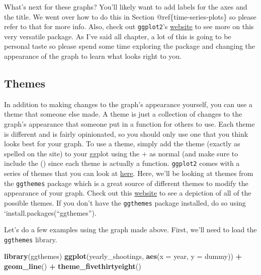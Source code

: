 \documentclass[
  12pt,
]{book}
\newenvironment{Shaded}{\begin{snugshade}}{\end{snugshade}}
\newcommand{\DataTypeTok}[1]{\textcolor[rgb]{0.27,0.27,0.27}{#1}}
\newcommand{\KeywordTok}[1]{\textcolor[rgb]{0.27,0.27,0.27}{\textbf{#1}}}
\newcommand{\NormalTok}[1]{#1}
\newcommand{\OperatorTok}[1]{\textcolor[rgb]{0.43,0.43,0.43}{\textbf{#1}}}
\newcommand{\StringTok}[1]{\textcolor[rgb]{0.5,0.5,0.5}{#1}}
\begin{document}
What's next for these graphs? You'll likely want to add labels for the axes and the title. We went over how to do this in Section @ref\{time-series-plots\} so please refer to that for more info. Also, check out \texttt{ggplot2}'s \href{https://ggplot2.tidyverse.org/reference/index.html\#section-scales}{website} to see more on this very versatile package. As I've said all chapter, a lot of this is going to be personal taste so please spend some time exploring the package and changing the appearance of the graph to learn what looks right to you.

\hypertarget{themes}{%
\subsection{Themes}\label{themes}}

In addition to making changes to the graph's appearance yourself, you can use a theme that someone else made. A theme is just a collection of changes to the graph's appearance that someone put in a function for others to use. Each theme is different and is fairly opinionated, so you should only use one that you think looks best for your graph. To use a theme, simply add the theme (exactly as spelled on the site) to your ggplot using the + as normal (and make sure to include the () since each theme is actually a function. \texttt{ggplot2} comes with a series of themes that you can look at \href{https://ggplot2.tidyverse.org/reference/ggtheme.html}{here}. Here, we'll be looking at themes from the \texttt{ggthemes} package which is a great source of different themes to modify the appearance of your graph. Check out this \href{https://yutannihilation.github.io/allYourFigureAreBelongToUs/ggthemes/}{website} to see a depiction of all of the possible themes. If you don't have the \texttt{ggthemes} package installed, do so using `install.packages(``ggthemes'').

Let's do a few examples using the graph made above. First, we'll need to load the \texttt{ggthemes} library.

\begin{Shaded}
\begin{Highlighting}[]
\KeywordTok{library}\NormalTok{(ggthemes)}
\KeywordTok{ggplot}\NormalTok{(yearly\_shootings, }\KeywordTok{aes}\NormalTok{(}\DataTypeTok{x =}\NormalTok{ year, }\DataTypeTok{y =}\NormalTok{ dummy)) }\OperatorTok{+}
\StringTok{  }\KeywordTok{geom\_line}\NormalTok{() }\OperatorTok{+}
\StringTok{  }\KeywordTok{theme\_fivethirtyeight}\NormalTok{()}
\end{Highlighting}
\end{Shaded}
\end{document}

